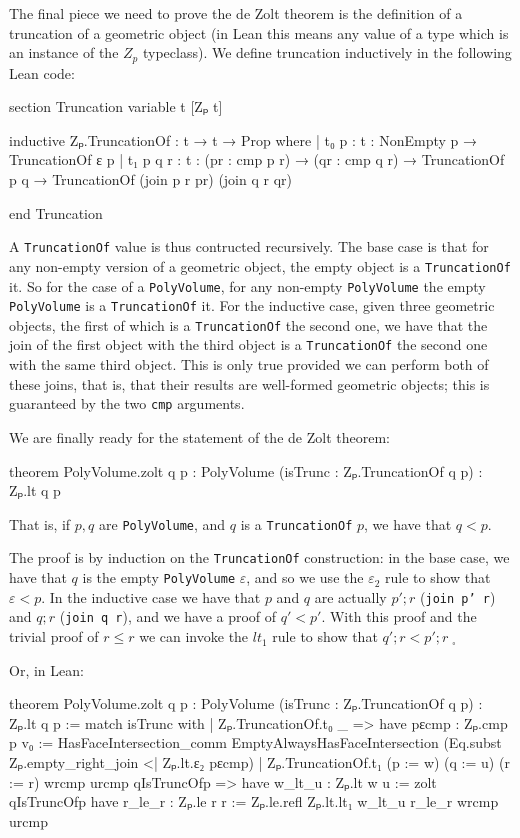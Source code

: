 \documentclass[12pt]{article} %
\newcommand{\leanline}[1]{\texttt{#1}} %
\newcommand{\pvolume}{\texttt{PolyVolume}} %
\newcommand{\truncof}{\texttt{TruncationOf}} %
\newcommand{\zp}{\ensuremath{Z_{p}}}
\begin{document}
The final piece we need to prove the de Zolt theorem is the definition of a truncation of a geometric object (in Lean this means any value of a type which is an instance of the \zp{} typeclass). %
We define truncation inductively in the following Lean code: %
\begin{leancode}
section Truncation
variable {t} [Zₚ t]

inductive Zₚ.TruncationOf : t → t → Prop where
| t₀ {p : t} : NonEmpty p → TruncationOf ε p
| t₁ {p q r : t} : (pr : cmp p r) → (qr : cmp q r)
    → TruncationOf p q
    → TruncationOf (join p r pr) (join q r qr)

end Truncation
\end{leancode}

A \truncof{} value is thus contructed recursively. %
The base case is that for any non-empty version of a geometric object, the empty object is a \truncof{} it. %
So for the case of a \pvolume, for any non-empty \pvolume{} the empty \pvolume{} is a \truncof{} it. %
For the inductive case, given three geometric objects, the first of which is a \truncof{} the second one, we have that the join of the first object with the third object is a \truncof{} the second one with the same third object. %
This is only true provided we can perform both of these joins, that is, that their results are well-formed geometric objects; this is guaranteed by the two \leanline{cmp} arguments. %

We are finally ready for the statement of the de Zolt theorem: %
\begin{leancode}
theorem PolyVolume.zolt {q p : PolyVolume}
  (isTrunc : Zₚ.TruncationOf q p)
  : Zₚ.lt q p
\end{leancode}
That is, if \(p, q\) are \pvolume, and \(q\) is a \truncof{} \(p\), we have that \(q < p\). %

The proof is by induction on the \truncof{} construction: in the base case, we have that \(q\) is the empty \pvolume{} \(\varepsilon\), and so we use the
\(\varepsilon_2\) rule to show that \(\varepsilon < p\). %
In the inductive case we have that \(p\) and \(q\) are actually \(p';r\) (\leanline{join p' r}) and \(q;r\) (\leanline{join q r}), and we
have a proof of \(q' < p'\). %
With this proof and the trivial proof of \(r \leq r\) we can invoke the \(lt_1\) rule to show that \(q';r < p';r\;_\square\) %

Or, in Lean: %

\begin{leancode}
theorem PolyVolume.zolt {q p : PolyVolume}
  (isTrunc : Zₚ.TruncationOf q p)
  : Zₚ.lt q p :=
  match isTrunc with
  | Zₚ.TruncationOf.t₀ _ =>
      have pεcmp : Zₚ.cmp p v₀
        := HasFaceIntersection_comm EmptyAlwaysHasFaceIntersection
      (Eq.subst Zₚ.empty_right_join <| Zₚ.lt.ε₂ pεcmp)
  | Zₚ.TruncationOf.t₁ (p := w) (q := u) (r := r) wrcmp urcmp qIsTruncOfp =>
    have w_lt_u : Zₚ.lt w u := zolt qIsTruncOfp
    have r_le_r : Zₚ.le r r := Zₚ.le.refl
    Zₚ.lt.lt₁ w_lt_u r_le_r wrcmp urcmp
\end{leancode}
\end{document}
